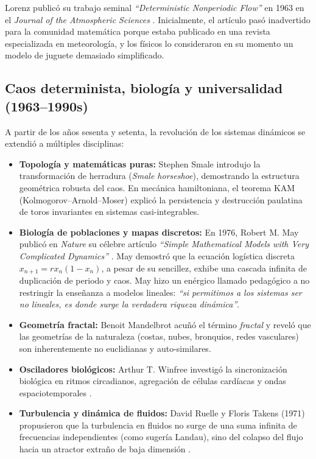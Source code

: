 Lorenz publicó su trabajo seminal \emph{``Deterministic Nonperiodic Flow''} en 1963 en el \emph{Journal of the Atmospheric Sciences} \cite{lorenz1963}. Inicialmente, el artículo pasó inadvertido para la comunidad matemática porque estaba publicado en una revista especializada en meteorología, y los físicos lo consideraron en su momento un modelo de juguete demasiado simplificado.

\subsection{Caos determinista, biología y universalidad (1963--1990s)}

A partir de los años sesenta y setenta, la revolución de los sistemas dinámicos se extendió a múltiples disciplinas:
\begin{itemize}
    \item \textbf{Topología y matemáticas puras:} Stephen Smale introdujo la transformación de herradura (\emph{Smale horseshoe}), demostrando la estructura geométrica robusta del caos. En mecánica hamiltoniana, el teorema KAM (Kolmogorov--Arnold--Moser) explicó la persistencia y destrucción paulatina de toros invariantes en sistemas casi-integrables.
    \item \textbf{Biología de poblaciones y mapas discretos:} En 1976, Robert M. May publicó en \emph{Nature} su célebre artículo \emph{``Simple Mathematical Models with Very Complicated Dynamics''} \cite{may1976}. May demostró que la ecuación logística discreta $x_{n+1} = r x_n(1 - x_n)$, a pesar de su sencillez, exhibe una cascada infinita de duplicación de periodo y caos. May hizo un enérgico llamado pedagógico a no restringir la enseñanza a modelos lineales: \emph{``si permitimos a los sistemas ser no lineales, es donde surge la verdadera riqueza dinámica''}.
    \item \textbf{Geometría fractal:} Benoit Mandelbrot acuñó el término \emph{fractal} y reveló que las geometrías de la naturaleza (costas, nubes, bronquios, redes vasculares) son inherentemente no euclidianas y auto-similares.
    \item \textbf{Osciladores biológicos:} Arthur T. Winfree investigó la sincronización biológica en ritmos circadianos, agregación de células cardíacas y ondas espaciotemporales \cite{winfree2001}.
    \item \textbf{Turbulencia y dinámica de fluidos:} David Ruelle y Floris Takens (1971) propusieron que la turbulencia en fluidos no surge de una suma infinita de frecuencias independientes (como sugería Landau), sino del colapso del flujo hacia un atractor extraño de baja dimensión \cite{ruelle1971}.

\end{itemize}
